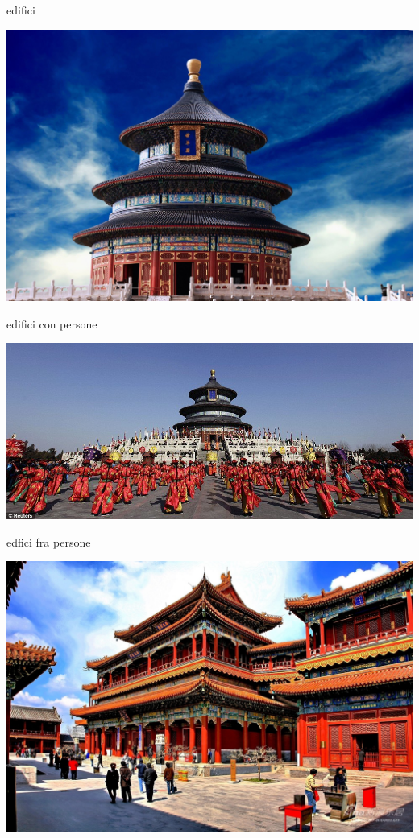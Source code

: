 \documentclass[presentation]{beamer}
\begin{document}
\begin{frame}[label={sec:org35293a7}]{edifici}
\begin{center}
\includegraphics[width=.9\linewidth]{./immagini/piccola_torre.jpg}
\end{center}
\end{frame}
\begin{frame}[label={sec:org9d8ea42}]{edifici con persone}
\begin{center}
\includegraphics[width=.9\linewidth]{./immagini/grande_torre.jpg}
\end{center}
\end{frame}
\begin{frame}[label={sec:org380b0e6}]{edfici \alert{fra} persone}
\begin{center}
\includegraphics[width=.9\linewidth]{./immagini/torri_ovunque.jpg}
\end{center}
\end{frame}
\end{document}
